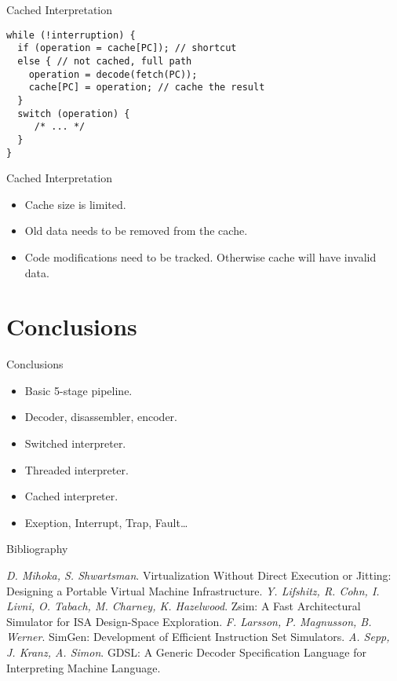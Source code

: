 \begin{frame}[fragile]{Cached Interpretation}
\begin{lstlisting}
while (!interruption) {
  if (operation = cache[PC]); // shortcut
  else { // not cached, full path
    operation = decode(fetch(PC));
    cache[PC] = operation; // cache the result
  }
  switch (operation) {
     /* ... */
  }
}
\end{lstlisting}
\end{frame}


\begin{frame}{Cached Interpretation}
\begin{itemize}
\item Cache size is limited.
\item Old data needs to be removed from the cache.
\item Code modifications need to be tracked. Otherwise cache will have invalid
  data.
\end{itemize}
\end{frame}

\section*{Conclusions}

\begin{frame}{Conclusions}
\begin{itemize}
\item Basic 5-stage pipeline.
\item Decoder, disassembler, encoder.
\item Switched interpreter.
\item Threaded interpreter.
\item Cached interpreter.
\item Exeption, Interrupt, Trap, Fault\dots
\end{itemize}
\end{frame}

\begin{frame}[allowframebreaks]{Bibliography}
\begin{thebibliography}{99}
  \bibitem{} \textit{D. Mihoka, S. Shwartsman}. Virtualization Without Direct
    Execution or Jitting: Designing a Portable Virtual Machine Infrastructure.
  \bibitem{} \textit{Y. Lifshitz, R. Cohn, I. Livni, O. Tabach, M. Charney, K.
    Hazelwood}. Zsim: A Fast Architectural Simulator for ISA Design-Space
    Exploration.
  \bibitem{} \textit{F. Larsson, P. Magnusson, B. Werner}. SimGen: Development of
    Efficient Instruction Set Simulators.
  \bibitem{} \textit{A. Sepp, J. Kranz, A. Simon}. GDSL: A Generic Decoder
    Specification Language for Interpreting Machine Language.
\end{thebibliography}
\end{frame}

